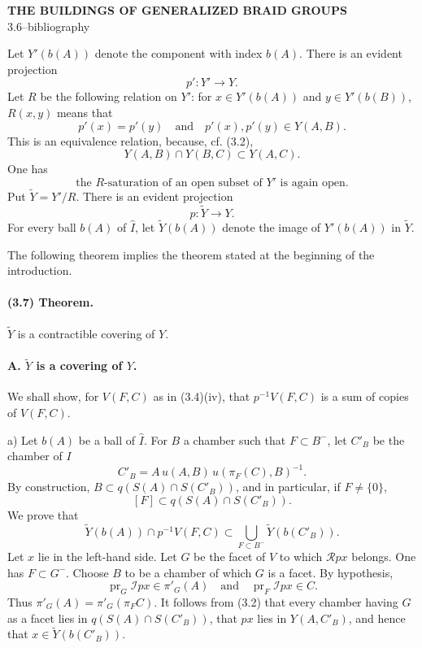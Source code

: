 \documentclass[10pt]{article}
\begin{document}
\begin{center}
{\Large\bfseries THE BUILDINGS OF GENERALIZED BRAID GROUPS}\\[0.4em]
{\normalsize 3.6--bibliography}
\end{center}


Let \(Y'(b(A))\) denote the component with index \(b(A)\). There is an evident projection
\[
p':Y'\longrightarrow Y.
\]
Let \(R\) be the following relation on \(Y'\): for \(x\in Y'(b(A))\) and \(y\in Y'(b(B))\), \(R(x,y)\) means that
\[
p'(x)=p'(y)\quad\text{and}\quad p'(x),p'(y)\in Y(A,B).
\]
This is an equivalence relation, because, cf. (3.2),
\[
Y(A,B)\cap Y(B,C)\subset Y(A,C).
\]
One has
\[
\tag{3.6.1}
\text{the }R\text{-saturation of an open subset of }Y'\text{ is again open.}
\]
Put \(\widetilde Y=Y'/R\). There is an evident projection
\[
p:\widetilde Y\longrightarrow Y.
\]
For every ball \(b(A)\) of \(\widehat I\), let \(\widetilde Y(b(A))\) denote the image of \(Y'(b(A))\) in \(\widetilde Y\).

The following theorem implies the theorem stated at the beginning of the introduction.

\paragraph{(3.7) Theorem.} \(\widetilde Y\) is a contractible covering of \(Y\).

\paragraph{A. \(\widetilde Y\) is a covering of \(Y\).} We shall show, for \(V(F,C)\) as in (3.4)(iv), that \(p^{-1}V(F,C)\) is a sum of copies of \(V(F,C)\).

a) Let \(b(A)\) be a ball of \(\widehat I\). For \(B\) a chamber such that \(F\subset B^{-}\), let \(C'_B\) be the chamber of \(I\)
\[
C'_B=A\,u(A,B)\,u(\pi_F(C),B)^{-1}.
\]
By construction, \(B\subset q(S(A)\cap S(C'_B))\), and in particular, if \(F\ne\{0\}\),
\[
\tag{3.7.1}
[F]\subset q(S(A)\cap S(C'_B)).
\]
We prove that
\[
\tag{3.7.2}
\widetilde Y(b(A))\cap p^{-1}V(F,C)
\subset
\bigcup_{F\subset B^-}\widetilde Y(b(C'_B)).
\]
Let \(x\) lie in the left-hand side. Let \(G\) be the facet of \(V\) to which \(\mathcal Rpx\) belongs. One has \(F\subset G^{-}\). Choose \(B\) to be a chamber of which \(G\) is a facet. By hypothesis,
\[
\operatorname{pr}_G\mathcal Ipx\in\pi'_G(A)
\quad\text{and}\quad
\operatorname{pr}_F\mathcal Ipx\in C.
\]
Thus \(\pi'_G(A)=\pi'_G(\pi_FC)\). It follows from (3.2) that every chamber having \(G\) as a facet lies in \(q(S(A)\cap S(C'_B))\), that \(px\) lies in \(Y(A,C'_B)\), and hence that \(x\in\widetilde Y(b(C'_B))\).
\end{document}

